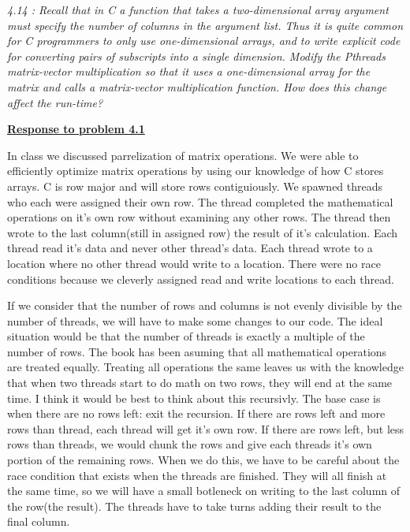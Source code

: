 \documentclass{article}
\begin{document}
\bigskip

\noindent \emph
{
	4.14 : Recall that in C a function that takes a two-dimensional array argument must
	specify the number of columns in the argument list. Thus it is quite common
	for C programmers to only use one-dimensional arrays, and to write explicit
	code for converting pairs of subscripts into a single dimension. Modify the
	Pthreads matrix-vector multiplication so that it uses a one-dimensional array
	for the matrix and calls a matrix-vector multiplication function. How does this
	change affect the run-time?
}

\bigskip

\noindent \textbf{\underline{Response to problem 4.1}}

\bigskip

In class we discussed parrelization of matrix operations. We were able to efficiently
optimize matrix operations by using our knowledge of how C stores arrays.
C is row major and will store rows contiguiously. We spawned threads who each were
assigned their own row. The thread completed the mathematical operations on it's own row without
examining any other rows. The thread then wrote to the last column(still in assigned row) the result of it's
calculation. Each thread read it's data and never other thread's data. Each thread wrote to a location
where no other thread would write to a location. There were no race conditions because we
cleverly assigned read and write locations to each thread.

If we consider that the number of rows and columns is not evenly divisible by the number of threads, we will
have to make some changes to our code.
The ideal situation would be that the number of threads is exactly a multiple of the number of rows.
The book has been asuming that all mathematical operations are treated equally. Treating all operations the
same leaves us with the knowledge that when two threads start to do math on two rows, they will end at the 
same time. I think it would be best to think about this recursivly. The base case is when there are no rows left: 
exit the recursion. If there are rows left and more rows than thread, each thread will get it's own row.
If there are rows left, but less rows than threads, we would chunk the rows and give each threads it's
own portion of the remaining rows. When we do this, we have to be careful about the race condition that 
exists when the threads are finished. They will all finish at the same time, so we will have a small 
botleneck on writing to the last column of the row(the result). The threads have to take turns adding 
their result to the final column. 
\end{document}
